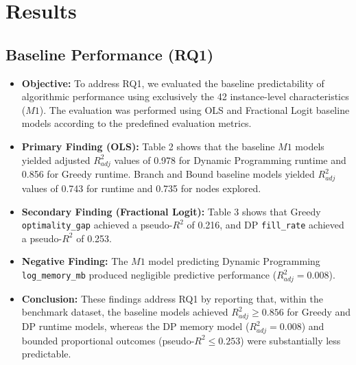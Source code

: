 \documentclass[11pt,a4paper]{article}
\begin{document}
\section{Results}

\subsection{Baseline Performance (RQ1)}
\begin{itemize}
  \item \textbf{Objective:} To address RQ1, we evaluated the baseline predictability of algorithmic performance using exclusively the 42 instance-level characteristics ($M1$). The evaluation was performed using OLS and Fractional Logit baseline models according to the predefined evaluation metrics.
  \item \textbf{Primary Finding (OLS):} Table 2 shows that the baseline $M1$ models yielded adjusted $R^2_{adj}$ values of 0.978 for Dynamic Programming runtime and 0.856 for Greedy runtime. Branch and Bound baseline models yielded $R^2_{adj}$ values of 0.743 for runtime and 0.735 for nodes explored.
  \item \textbf{Secondary Finding (Fractional Logit):} Table 3 shows that Greedy \texttt{optimality\_gap} achieved a pseudo-$R^2$ of 0.216, and DP \texttt{fill\_rate} achieved a pseudo-$R^2$ of 0.253.
  \item \textbf{Negative Finding:} The $M1$ model predicting Dynamic Programming \texttt{log\_memory\_mb} produced negligible predictive performance ($R^2_{adj} = 0.008$).
  \item \textbf{Conclusion:} These findings address RQ1 by reporting that, within the benchmark dataset, the baseline models achieved $R^2_{adj} \ge 0.856$ for Greedy and DP runtime models, whereas the DP memory model ($R^2_{adj} = 0.008$) and bounded proportional outcomes (pseudo-$R^2 \le 0.253$) were substantially less predictable.
\end{itemize}
\end{document}
